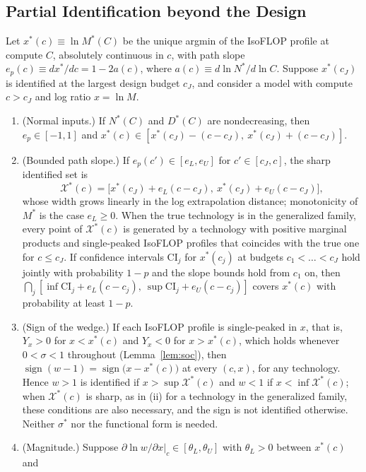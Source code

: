 \subsection{Partial Identification beyond the Design}\label{app:pi}

\begin{proposition}\label{prop:A-pi}
Let $x^*(c)\equiv\ln M^*(C)$ be the unique argmin of the IsoFLOP profile at compute $C$, absolutely continuous in $c$, with
path slope $e_p(c)\equiv dx^*/dc=1-2a(c)$, where $a(c)\equiv d\ln N^*/d\ln C$. Suppose $x^*(c_J)$ is identified at the
largest design budget $c_J$, and consider a model with compute $c>c_J$ and log ratio $x=\ln M$.
\begin{enumerate}
\item[(i)] (Normal inputs.) If $N^*(C)$ and $D^*(C)$ are nondecreasing, then $e_p\in[-1,1]$ and
$x^*(c)\in[x^*(c_J)-(c-c_J),\ x^*(c_J)+(c-c_J)]$.
\item[(ii)] (Bounded path slope.) If $e_p(c')\in[e_L,e_U]$ for $c'\in[c_J,c]$, the sharp identified set is
\[
\mathcal X^*(c)=\big[x^*(c_J)+e_L(c-c_J),\ x^*(c_J)+e_U(c-c_J)\big],
\]
whose width grows linearly in the log extrapolation distance; monotonicity of $M^*$ is the case $e_L\ge0$.
When the true technology is in the generalized family, every point of $\mathcal X^*(c)$ is generated by a technology with
positive marginal products and single-peaked IsoFLOP profiles that coincides with the true one for $c\le c_J$. If
confidence intervals $\mathrm{CI}_j$ for $x^*(c_j)$ at budgets $c_1<\dots<c_J$ hold jointly with probability $1-p$ and the
slope bounds hold from $c_1$ on, then
$\bigcap_j[\inf\mathrm{CI}_j+e_L(c-c_j),\ \sup\mathrm{CI}_j+e_U(c-c_j)]$ covers $x^*(c)$ with probability at least $1-p$.
\item[(iii)] (Sign of the wedge.) If each IsoFLOP profile is single-peaked in $x$, that is, $Y_x>0$ for $x<x^*(c)$ and
$Y_x<0$ for $x>x^*(c)$, which holds whenever $0<\sigma<1$ throughout (Lemma~\ref{lem:soc}), then
$\operatorname{sign}(w-1)=\operatorname{sign}\big(x-x^*(c)\big)$ at every $(c,x)$, for any technology. Hence $w>1$ is
identified if $x>\sup\mathcal X^*(c)$ and $w<1$ if $x<\inf\mathcal X^*(c)$; when $\mathcal X^*(c)$ is sharp, as in (ii)
for a technology in the generalized family, these conditions are also necessary, and the sign is not identified
otherwise. Neither $\sigma^*$ nor the functional form is needed.
\item[(iv)] (Magnitude.) Suppose $\partial\ln w/\partial x|_c\in[\theta_L,\theta_U]$ with $\theta_L>0$ between $x^*(c)$ and

\end{enumerate}
\end{proposition}
